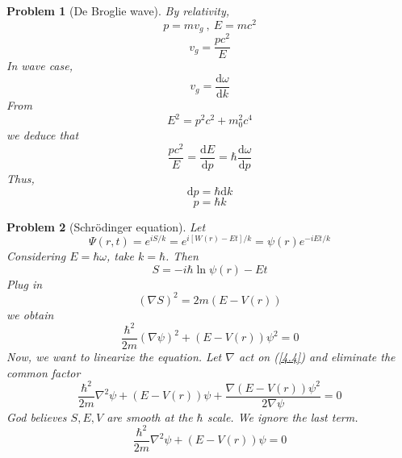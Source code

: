 \documentclass{article}
\theoremstyle{t}
\newtheorem{problem}{Problem}
\newcommand{\dd}{\mathrm{d}}
\begin{document}
\begin{problem}[De Broglie wave]
    By relativity,
    \begin{equation}
        p=mv_g\ ,\  E=mc^2
    \end{equation}
    \begin{equation}
        v_g=\frac{pc^2}{E}
    \end{equation}
    In wave case, 
    \begin{equation}
        v_g=\frac{\dd \omega}{\dd k}
    \end{equation}
    From 
    \begin{equation}
        E^2=p^2c^2+m_0^2c^4
    \end{equation}
    we deduce that 
    \begin{equation}
        \frac{pc^2}{E}=\frac{\dd E}{\dd p}=\hbar\frac{\dd \omega}{\dd p}
    \end{equation}
    Thus, 
    \begin{equation*}
        \dd p=\hbar \dd k
    \end{equation*}
    \begin{equation}
        \boxed{p=\hbar k}
    \end{equation}

\end{problem}
\begin{problem}[Schrödinger equation]
     Let 
     \begin{equation}
        \Psi(r,t)=e^{iS/k}=e^{i[W(r)-Et]/k}=\psi(r)e^{-iEt/k}
     \end{equation}
     Considering $E=\hbar \omega$, take $k=\hbar$. Then
     \begin{equation}
        S=-i\hbar \ln \psi(r)-Et
     \end{equation}
     Plug in 
     \begin{equation}
        \left(\nabla S\right)^2=2m\left(E-V(r)\right)
     \end{equation}
     we obtain
     \begin{equation}\label{4.4}
        \frac{\hbar^2}{2m}\left(\nabla \psi\right)^2+\left(E-V(r)\right)\psi^2=0
     \end{equation}
     Now, we want to linearize the equation. Let $\nabla$ act on (\ref{4.4}) and eliminate the common factor
     \begin{equation}
        \frac{\hbar^2}{2m}\nabla^2\psi+\left(E-V(r)\right)\psi+\frac{\nabla(E-V(r))\psi^2}{2\nabla\psi}=0
     \end{equation}
     God believes $S,E,V$ are smooth at the $\hbar$ scale. We ignore the last term.
     \begin{equation}
        \boxed{\frac{\hbar^2}{2m}\nabla^2\psi+\left(E-V(r)\right)\psi=0}
     \end{equation}
\end{problem}
\end{document}
